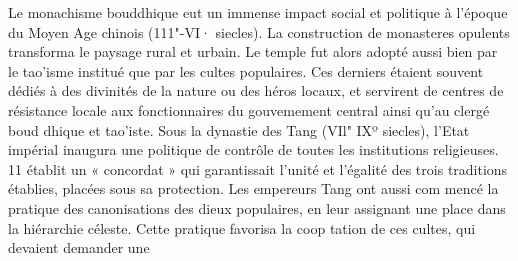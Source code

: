 Le monachisme bouddhique eut un immense impact social et politique à l'époque du Moyen  Age chinois (111"-VI· siecles). La construction de monasteres opulents transforma le paysage rural et urbain. Le temple fut alors adopté aussi bien par le tao'isme institué que par les cultes populaires. Ces derniers étaient souvent dédiés à des divinités de la nature ou des héros locaux, et servirent de centres de résistance locale aux fonctionnaires du gouvemement central ainsi qu'au clergé boud  dhique et tao'iste. Sous la dynastie des Tang (VIl"  IXº siecles), l'Etat impérial inaugura une politique de contrôle de toutes les institutions religieuses. 11 établit un « concordat » qui garantissait l'unité et l'égalité des trois traditions établies, placées sous sa protection. Les empereurs Tang ont aussi com  mencé la pratique des canonisations des dieux populaires, en leur assignant une place dans la hiérarchie céleste. Cette pratique favorisa la coop  tation de ces cultes, qui devaient demander une
 
